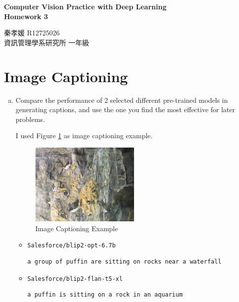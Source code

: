 \documentclass[10pt,a4paper]{article}
\begin{document}
\title{}
\author{}


\begin{center}
\textbf{\Large Computer Vision Practice with Deep Learning \\[5pt]
Homework 3}

秦孝媛 R12725026 \\
資訊管理學系研究所 一年級
\end{center}
\section*{Image Captioning}
\begin{enumerate}[(a)]
\item Compare the performance of 2 selected different pre-trained models in
generating captions, and use the one you find the most effective for later
problems.

I used Figure \ref{fig:IMG_8531} as image captioning example.

\begin{figure}[hbt]
\centering
\includegraphics[width=0.5\textwidth]{figure/IMG_8531_jpg.rf.abe45b49de6d004d043f2e5bda2763bd.png}
\caption{Image Captioning Example}
\label{fig:IMG_8531}
\end{figure}

\begin{itemize}
\item \verb|Salesforce/blip2-opt-6.7b|
\begin{lstlisting}[frame=single]
a group of puffin are sitting on rocks near a waterfall
\end{lstlisting}

\item \verb|Salesforce/blip2-flan-t5-xl|
\begin{lstlisting}[frame=single]
a puffin is sitting on a rock in an aquarium
\end{lstlisting}
\end{itemize}


\end{enumerate}
\end{document}
